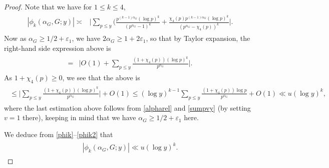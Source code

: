 \documentclass[twoside,leqno,10pt, A4]{amsart}
\begin{document}
\begin{proof}
  Note that we have for $1 \leq k \leq 4$,
\begin{align}
\label{phik}
\begin{split}
  |\phi_k(\alpha_G,G;y)| \asymp & \Big|\sum_{p \leq y}(\frac {p^{(k-1)\alpha_G}(\log p)^k}{(p^{\alpha_G}-1)^k}+\frac {\chi_4(p)p^{(k-1)\alpha_G}(\log p)^k}{(p^{\alpha_G}-\chi_4(p))^k}\Big |.
\end{split}
\end{align}     
   Now as $\alpha_G \geq 1/2+\varepsilon_1$, we have $2\alpha_G \geq 1+2\varepsilon_1$, so that by Taylor expansion, the right-hand side expression above is
\begin{align}
\label{phik1}
\begin{split}
  = & \Big|O(1)+\sum_{p \leq y}\frac {(1+\chi_4(p))(\log p)^k}{p^{\alpha_G}}\Big |. 
\end{split}
\end{align}     
  As $1+\chi_4(p) \geq 0$, we see that the above is
\begin{align}
\label{phik2}
\begin{split}
  \leq \Big |\sum_{p \leq y}\frac {(1+\chi_4(p))(\log p)^k}{p^{\alpha_G}}\Big |+O(1)
  \leq (\log y)^{k-1} \sum_{p \leq y}\frac {(1+\chi_4(p))\log p}{p^{\alpha_G}}+O(1) \ll u(\log y)^{k}, 
\end{split}
\end{align} 
 where the last estimation above follows from \eqref{alpharel} and \eqref{sumpvy} (by setting $v=1$ there), keeping in mind that we have $\alpha_G \geq 1/2+\varepsilon_1$ here.   
  
  We deduce from \eqref{phik}--\eqref{phik2} that
\begin{align}
\label{phikupper}
\begin{split}
  |\phi_k(\alpha_G,G;y)| \ll u(\log y)^{k}.
\end{split}
\end{align} 


\end{proof}
\end{document}
